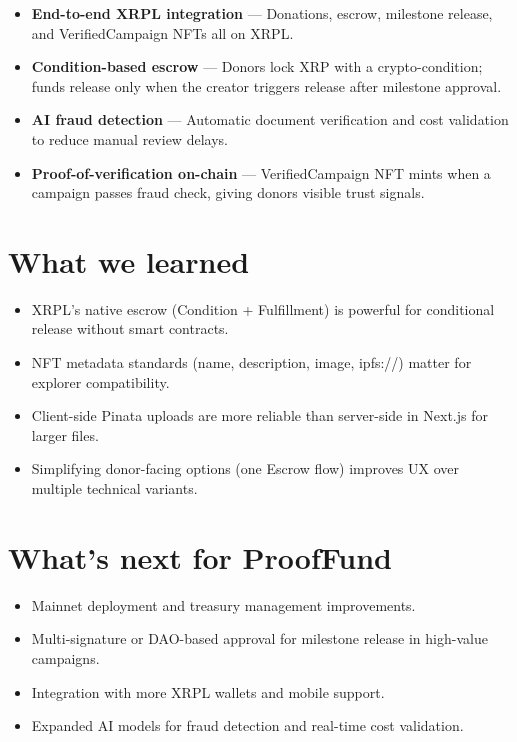 \documentclass[11pt]{article}
\begin{document}
\begin{itemize}[noitemsep]
\item \textbf{End-to-end XRPL integration} — Donations, escrow, milestone release, and VerifiedCampaign NFTs all on XRPL.
\item \textbf{Condition-based escrow} — Donors lock XRP with a crypto-condition; funds release only when the creator triggers release after milestone approval.
\item \textbf{AI fraud detection} — Automatic document verification and cost validation to reduce manual review delays.
\item \textbf{Proof-of-verification on-chain} — VerifiedCampaign NFT mints when a campaign passes fraud check, giving donors visible trust signals.
\end{itemize}

\section{What we learned}

\begin{itemize}[noitemsep]
\item XRPL's native escrow (Condition + Fulfillment) is powerful for conditional release without smart contracts.
\item NFT metadata standards (name, description, image, ipfs://) matter for explorer compatibility.
\item Client-side Pinata uploads are more reliable than server-side in Next.js for larger files.
\item Simplifying donor-facing options (one Escrow flow) improves UX over multiple technical variants.
\end{itemize}

\section{What's next for ProofFund}

\begin{itemize}[noitemsep]
\item Mainnet deployment and treasury management improvements.
\item Multi-signature or DAO-based approval for milestone release in high-value campaigns.
\item Integration with more XRPL wallets and mobile support.
\item Expanded AI models for fraud detection and real-time cost validation.
\end{itemize}
\end{document}
